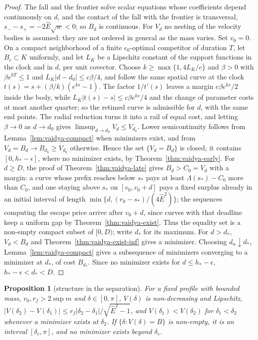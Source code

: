 \documentclass[aip,jmp,amsmath,amssymb,reprint]{revtex4-2}
\newcommand{\Ehat}{\hat E}
\theoremstyle{plain}
\newtheorem{proposition}{Proposition}[section]
\theoremstyle{definition}
\begin{document}
\begin{proof}
The fall and the frontier solve scalar equations whose coefficients depend continuously on $d$, and the
contact of the fall with the frontier is transversal, $s_--s_+=-2\Ehat\sqrt w<0$; so $B_d$ is continuous. For
$V_d$ no nesting of the velocity bodies is assumed: they are not ordered in general as the mass varies.
Set $v_0=0$. On a compact neighborhood of a finite $\epsilon_0$-optimal competitor of duration $T$, let
$B_c\subset K$ uniformly, and let $L_K$ be a Lipschitz constant of the support functions in the clock and in
$d$, per unit covector. Choose $k\ge\max\{1,4L_K/c\}$ and $\beta>0$ with $\beta e^{kT}\le1$ and $L_K|d-d_0|\le c\beta/4$,
and follow the same spatial curve at the clock $t(s)=s+(\beta/k)(e^{ks}-1)$. The factor $1/t'(s)$ leaves a margin
$c\beta e^{ks}/2$ inside the body, while $L_K|t(s)-s|\le c\beta e^{ks}/4$ and the change of parameter costs at most
another quarter; so the retimed curve is admissible for $d$, with the same end points. The radial
reduction turns it into a rail of equal cost, and letting $\beta\to0$ as $d\to d_0$ gives
$\limsup_{d\to d_0}V_d\le V_{d_0}$. Lower semicontinuity follows
from Lemma~\ref{lem:vaidya-compact} when minimizers exist, and from $V_d=B_d\to B_{d_0}\ge V_{d_0}$ otherwise.
Hence the set $\{V_d=B_d\}$ is closed; it contains $[0,h_*-\epsilon]$, where no minimizer exists, by
Theorem~\ref{thm:vaidya-early}. For $d\ge D$, the proof of Theorem~\ref{thm:vaidya-late} gives $B_d>C_0=V_d$ with a
margin: a curve whose prefix reaches below $s_*$ pays at least $\Lambda(s_*)-C_0$ more than $C_0$, and one staying
above $s_*$ on $[v_0,v_0+d]$ pays a fixed surplus already in an initial interval of length
$\min\{d,(r_0-s_*)/(4\Ehat^2)\}$; the sequences computing the escape price arrive after $v_0+d$, since curves with
that deadline keep a uniform gap by Theorem~\ref{thm:vaidya-exist}. Thus the equality set is a non-empty compact
subset of $[0,D)$; write $d_*$ for its maximum. For $d>d_*$, $V_d<B_d$ and Theorem~\ref{thm:vaidya-exist-inf} gives a
minimizer. Choosing $d_n\downarrow d_*$, Lemma~\ref{lem:vaidya-compact} gives a subsequence of minimizers converging
to a minimizer at $d_*$, of cost $B_{d_*}$. Since no minimizer exists for $d\le h_*-\epsilon$, $h_*-\epsilon<d_*<D$.
\end{proof}

\begin{proposition}[structure in the separation]\label{prop:vaidya-delta}
For a fixed profile with bounded mass, $r_0,r_f>2\sup m$ and $\delta\in[0,\pi]$, $V(\delta)$ is non-decreasing and Lipschitz,
$|V(\delta_2)-V(\delta_1)|\le r_f|\delta_2-\delta_1|/\sqrt{\Ehat^2-1}$, and $V(\delta_1)<V(\delta_2)$ for $\delta_1<\delta_2$ whenever a
minimizer exists at $\delta_2$. If $\{\delta:V(\delta)=B\}$ is non-empty, it is an interval $[\delta_c,\pi]$, and no minimizer
exists beyond $\delta_c$.
\end{proposition}
\end{document}
